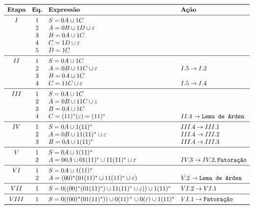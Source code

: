 \documentclass[12pt]{article}
\newcommand{\ve}{\ensuremath{\varepsilon}}
\begin{document}
\begin{tcolorbox}[breakable,rounded corners, colback=yellow!5, colframe=red!40!black, title={Extração de expressão regular $\mathcal{R}_1$ da gramática $G$, tal que $\mathcal{L}(\mathcal{R}_1)=\mathcal{L}(G_1)$}]
  $$
  \begin{array}{ccll}
  \toprule
  \textbf{Etapa} & \textbf{Eq.} & \textbf{Expressão} & \textbf{Ação}\\
  
  \midrule
    I & 1 & S = 0A \cup 1C           &\\
      & 2 & A = 0B \cup 1D \cup \ve  &\\
      & 3 & B = 0A \cup 1C           &\\
      & 4 & C = 1D \cup \ve          &\\
      & 5 & D = 1C                   &\\
  \midrule
   II & 1 & S = 0A \cup 1C           &\\
      & 2 & A = 0B \cup 11C \cup \ve & I.5 \to I.2 \\
      & 3 & B = 0A \cup 1C           &\\
      & 4 & C = 11C \cup \ve & I.5 \to I.4         \\
  \midrule
  III & 1 & S = 0A \cup 1C           &\\
      & 2 & A = 0B \cup 11C \cup \ve &\\
      & 3 & B = 0A \cup 1C           &\\
      & 4 & C = (11)^*(\ve) = (11)^* & II.4 \to \texttt{Lema de Arden} \\
  \midrule
  IV  & 1 & S = 0A \cup 1(11)^*           & III.4 \to III.1\\
      & 2 & A = 0B \cup 11(11)^* \cup \ve & III.4 \to III.2\\
      & 3 & B = 0A \cup 1(11)^*           & III.4 \to III.3\\
  \midrule
   V  & 1 & S = 0A \cup 1(11)^*           &\\
      & 2 & A = 00A \cup 01(11)^* \cup 11(11)^* \cup \ve & IV.3 \to IV.2, \texttt{Fatoração}\\
  \midrule
   VI & 1 & S = 0A \cup 1(11)^*           &\\
      & 2 & A = (00)^*(01(11)^* \cup 11(11)^* \cup \ve) & V.2 \to \texttt{Lema de Arden}\\
  \midrule
  VII & 1 & S = 0((00)^*(01(11)^*) \cup 11(11)^* \cup \ve)) \cup 1(11)^* & VI.2 \to VI.1\\
  \midrule
 VIII & 1 & S = 0((00)^*(01(11)^*)) \cup 0(11)^+ \cup 0(\ve) \cup 1(11)^* & VI.1 \to \texttt{Fatoração}\\
  \bottomrule
  \end{array}
  $$
\end{tcolorbox}\bigskip
\end{document}
